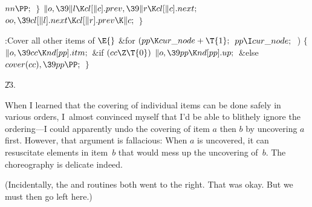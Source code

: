 ${}\\{nn}\PP;{}$\6
\4${}\}{}$\2\2\6
${}\|o,\39\|l\K\\{cl}[\|c].\\{prev},\39\|r\K\\{cl}[\|c].\\{next};{}$\6
${}\\{oo},\39\\{cl}[\|l].\\{next}\K\\{cl}[\|r].\\{prev}\K\|c;{}$\6
\4${}\}{}$\2\par
\fi

\B{}:Cover all other items of \X${}\E{}$\6
\&{for} ${}(\\{pp}\K\\{cur\_node}+\T{1};{}$ ${}\\{pp}\I\\{cur\_node};{}$ \,)\5
${}\{{}$\1\6
${}\|o,\39\\{cc}\K\\{nd}[\\{pp}].\\{itm};{}$\6
\&{if} ${}(\\{cc}\Z\T{0}){}$\1\5
${}\|o,\39\\{pp}\K\\{nd}[\\{pp}].\\{up};{}$\2\6
\&{else}\1\5
${}\\{cover}(\\{cc}),\39\\{pp}\PP;{}$\2\6
\4${}\}{}$\2\par
\U23.\fi

When I learned that the covering of individual items can be done safely
in
various orders, I~almost convinced myself that I'd be able
to blithely ignore the ordering---I could apparently
undo the covering of item $a$ then $b$ by uncovering $a$ first.
However, that argument is fallacious: When $a$ is uncovered, it
can resuscitate elements in item~$b$ that would mess up the
uncovering of~$b$. The choreography is delicate indeed.

(Incidentally, the  and  routines both went to
the right.
That was okay. But we must then go left here.)

